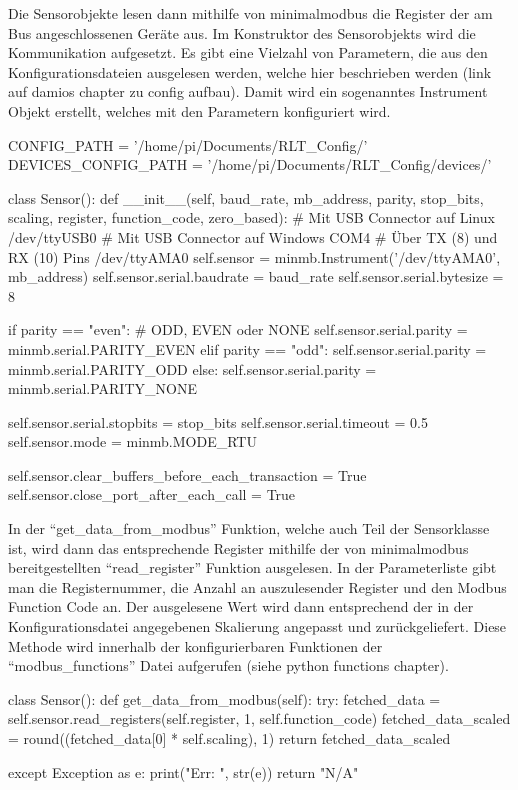 Die Sensorobjekte lesen dann mithilfe von minimalmodbus die Register der am Bus angeschlossenen Geräte aus. Im Konstruktor des Sensorobjekts wird die Kommunikation aufgesetzt. Es gibt eine Vielzahl von Parametern, die aus den Konfigurationsdateien ausgelesen werden, welche hier beschrieben werden (link auf damios chapter zu config aufbau). Damit wird ein sogenanntes Instrument Objekt erstellt, welches mit den Parametern konfiguriert wird.

\begin{pythoncode}
CONFIG_PATH = '/home/pi/Documents/RLT_Config/'
DEVICES_CONFIG_PATH = '/home/pi/Documents/RLT_Config/devices/'

class Sensor():
	def __init__(self, baud_rate, mb_address, parity, stop_bits, scaling, register, function_code, zero_based):
        # Mit USB Connector auf Linux       /dev/ttyUSB0
		# Mit USB Connector auf Windows     COM4
		# Über TX (8) und RX (10) Pins      /dev/ttyAMA0
		self.sensor = minmb.Instrument('/dev/ttyAMA0', mb_address)
		self.sensor.serial.baudrate = baud_rate
		self.sensor.serial.bytesize = 8
		
		if parity == "even":  # ODD, EVEN oder NONE
			self.sensor.serial.parity = minmb.serial.PARITY_EVEN
		elif parity == "odd":
			self.sensor.serial.parity = minmb.serial.PARITY_ODD
		else:
			self.sensor.serial.parity = minmb.serial.PARITY_NONE
		
		self.sensor.serial.stopbits = stop_bits
		self.sensor.serial.timeout = 0.5
		self.sensor.mode = minmb.MODE_RTU
		
		self.sensor.clear_buffers_before_each_transaction = True
		self.sensor.close_port_after_each_call = True
\end{pythoncode}

\label{get_data_from_modbus}
In der \enquote{get\_data\_from\_modbus} Funktion, welche auch Teil der Sensorklasse ist, wird dann das entsprechende Register mithilfe der von minimalmodbus bereitgestellten \enquote{read\_register} Funktion ausgelesen. In der Parameterliste gibt man die Registernummer, die Anzahl an auszulesender Register und den Modbus Function Code an. Der ausgelesene Wert wird dann entsprechend der in der Konfigurationsdatei angegebenen Skalierung angepasst und zurückgeliefert. Diese Methode wird innerhalb der konfigurierbaren Funktionen der \enquote{modbus\_functions} Datei aufgerufen (siehe python functions chapter).

\begin{pythoncode}
class Sensor():
	def get_data_from_modbus(self):
		try:
			fetched_data = self.sensor.read_registers(self.register, 1, self.function_code)
			fetched_data_scaled = round((fetched_data[0] * self.scaling), 1)
			return fetched_data_scaled
		
		except Exception as e:
			print("Err: ", str(e))
			return "N/A"
\end{pythoncode}

